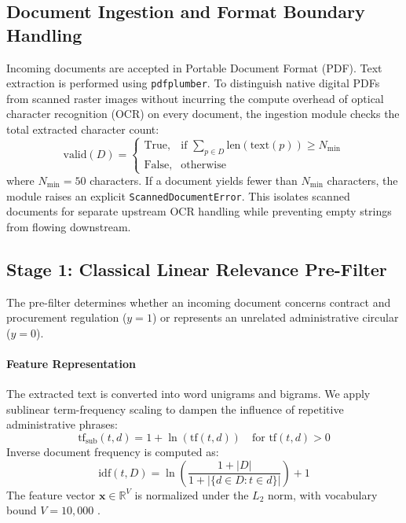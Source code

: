 \documentclass{article}
\begin{document}
\subsection{Document Ingestion and Format Boundary Handling}
Incoming documents are accepted in Portable Document Format (PDF). Text extraction is performed using \texttt{pdfplumber}. To distinguish native digital PDFs from scanned raster images without incurring the compute overhead of optical character recognition (OCR) on every document, the ingestion module checks the total extracted character count:
\begin{equation}
    \text{valid}(D) = \begin{cases}
    \text{True}, & \text{if } \sum_{p \in D} \text{len}(\text{text}(p)) \ge N_{\min} \\
    \text{False}, & \text{otherwise}
    \end{cases}
\end{equation}
where $N_{\min} = 50$ characters. If a document yields fewer than $N_{\min}$ characters, the module raises an explicit \texttt{ScannedDocumentError}. This isolates scanned documents for separate upstream OCR handling while preventing empty strings from flowing downstream.

\subsection{Stage 1: Classical Linear Relevance Pre-Filter}
The pre-filter determines whether an incoming document concerns contract and procurement regulation ($y = 1$) or represents an unrelated administrative circular ($y = 0$).

\paragraph{Feature Representation}
The extracted text is converted into word unigrams and bigrams. We apply sublinear term-frequency scaling to dampen the influence of repetitive administrative phrases:
\begin{equation}
    \text{tf}_{\text{sub}}(t, d) = 1 + \ln(\text{tf}(t, d)) \quad \text{for } \text{tf}(t, d) > 0
\end{equation}
Inverse document frequency is computed as:
\begin{equation}
    \text{idf}(t, D) = \ln \left( \frac{1 + |D|}{1 + |\{d \in D : t \in d\}|} \right) + 1
\end{equation}
The feature vector $\mathbf{x} \in \mathbb{R}^{V}$ is normalized under the $L_2$ norm, with vocabulary bound $V = 10{,}000$ \citep{salton1988term}.
\end{document}
